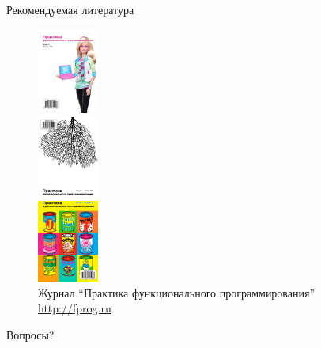 \documentclass{beamer}
\begin{document}
\begin{frame}{Рекомендуемая литература}
  \begin{figure}
    \begin{minipage}{0.3\linewidth}
      \begin{center}
        \includegraphics[width=20mm]{lecture0/pfp2010-04.eps}
      \end{center}
    \end{minipage}
    \begin{minipage}{0.3\linewidth}
      \begin{center}
        \includegraphics[width=20mm]{lecture0/pfp2010-06.eps}
      \end{center}
    \end{minipage}
    \begin{minipage}{0.3\linewidth}
      \begin{center}
        \includegraphics[width=20mm]{lecture0/pfp2011-07.eps}
      \end{center}
    \end{minipage}
    \caption{Журнал ``Практика функционального программирования''
      \url{http://fprog.ru}}
  \end{figure}
\end{frame}

\begin{frame}
  \begin{center}
    \LARGE{Вопросы?}
  \end{center}
\end{frame}
\end{document}
